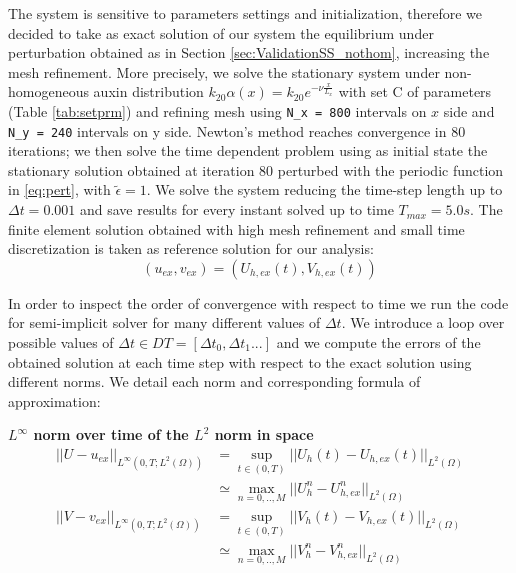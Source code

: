 The system is sensitive to parameters settings and initialization, therefore we decided to take as exact solution of our system the equilibrium under perturbation obtained as in Section \ref{sec:ValidationSS_nothom}, increasing the mesh refinement. More precisely, we solve the stationary system under non-homogeneous auxin distribution $k_{20} \alpha(x) = k_{20} e^{-\nu \frac{x}{L_x}}$ with set C of parameters (Table \ref{tab:setprm}) and refining mesh using \verb|N_x = 800| intervals on $x$ side and \verb|N_y = 240| intervals on y side. Newton's method reaches convergence in 80 iterations; we then solve the time dependent problem using as initial state the stationary solution obtained at iteration 80 perturbed with the periodic function in \eqref{eq:pert}, with $\tilde{\epsilon} = 1$. We solve the system reducing the time-step length up to $\Delta t = 0.001$ and save results for every instant solved up to time $T_{max} = 5.0 s$. The finite element solution obtained with high mesh refinement and small time discretization is taken as reference solution for our analysis:
\begin{equation*}
  \left( u_{ex}, v_{ex} \right) = \left(U_{h,ex}(t), V_{h,ex}(t)\right)
\end{equation*}

In order to inspect the order of convergence with respect to time we run the code for semi-implicit solver for many different values of $\Delta t$. We introduce a loop over possible values of $\Delta t \in  DT = [\Delta t_0,\Delta t_1 ...]$ and we compute the errors of the obtained solution at each time step with respect to the exact solution using different norms. We detail each norm and corresponding formula of approximation:

\textbf{$L^{\infty}$ norm over time of the $L^2$ norm in space}
\begin{equation}\begin{aligned}
  ||U-u_{ex}||_{L^{\infty}\left(0, T; L^2\left(\Omega\right) \right)} & = \sup_{t \in (0, T)} ||U_h(t)-U_{h,ex}(t)||_{L^2\left(\Omega\right)} \\ & \simeq \max_{n = 0, .., M} ||U_h^n - U_{h,ex}^n||_{L^2(\Omega)} \\
  ||V-v_{ex}||_{L^{\infty}\left(0, T; L^2\left(\Omega\right) \right)} & = \sup_{t \in (0, T)} ||V_h(t)-V_{h,ex}(t)||_{L^2\left(\Omega\right)}  \\ & \simeq \max_{n = 0, .., M} ||V_h^n - V_{h,ex}^n||_{L^2(\Omega)}
\end{aligned} \end{equation}

